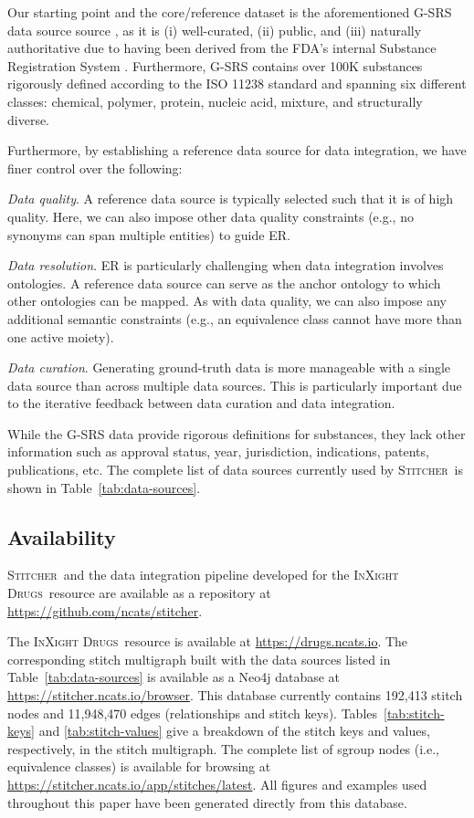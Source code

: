 \documentclass{bmcart}
\newcommand\st{\textsc{Stitcher}}
\newcommand\ix{\textsc{InXight Drugs}}
\begin{document}
Our starting point and the core/reference dataset is the aforementioned G-SRS 
data source source \cite{GSRSData}, as it is (i) well-curated, (ii) public, and (iii) naturally 
authoritative due to having been derived from the FDA’s internal Substance Registration System \cite{GSRS}. Furthermore, G-SRS contains over
100K substances rigorously defined according to the ISO 11238 standard and spanning 
six different classes: chemical, polymer, protein, nucleic acid, mixture, and structurally diverse. 

Furthermore, by establishing a reference data source
for data integration, we have finer control over the following: 
\begin{description}
\item{\emph{Data quality}.} A reference data source is typically
selected such that it is of high quality. Here, we can also impose
other data quality constraints (e.g., no synonyms can span multiple
entities) to guide ER. 
\item{\emph{Data resolution}.} ER is particularly
challenging when data integration involves ontologies. A reference
data source can serve as the anchor ontology to which other
ontologies can be mapped. As with data quality, we can also impose any
additional semantic constraints (e.g., an equivalence class cannot
have more than one active moiety). 
\item{\emph{Data curation}.} Generating ground-truth data is more
manageable with a single data source than across multiple data sources.
This is particularly important due to the iterative feedback between
data curation and data integration. 
\end{description}
While the G-SRS data provide rigorous definitions for substances, they lack
other information such as approval status, year, jurisdiction,
indications, patents, publications, etc. The complete list of
data sources currently used by \st\ is shown in Table~\ref{tab:data-sources}.

\subsection*{Availability}
\st\ and the data integration pipeline developed for the \ix\ resource 
are available as a repository at \url{https://github.com/ncats/stitcher}.

The \ix\ resource is available at \url{https://drugs.ncats.io}. The corresponding 
stitch multigraph built with the data sources listed in Table~\ref{tab:data-sources} 
is available as a Neo4j database  at \url{https://stitcher.ncats.io/browser}. 
This database currently contains 192,413 stitch nodes and 11,948,470 edges 
(relationships and stitch keys). Tables~\ref{tab:stitch-keys} and \ref{tab:stitch-values} 
give a breakdown of the stitch keys and values, respectively, in the stitch
multigraph. The complete list of sgroup nodes (i.e., equivalence classes) is
available for browsing at
\url{https://stitcher.ncats.io/app/stitches/latest}. All figures and
examples used throughout this paper have been generated directly from
this database.
\end{document}

